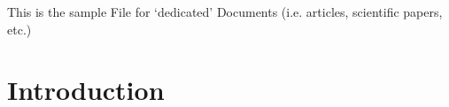 %


This is the sample File for \enquote*{dedicated} Documents (i.e. articles, scientific papers, etc.)


%



\section{Introduction}
\label{sec:intro}







